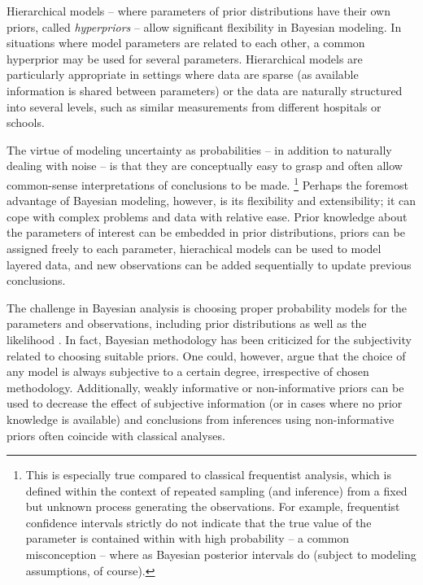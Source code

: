 Hierarchical models -- where parameters of prior distributions have their own
priors, called \emph{hyperpriors} -- allow significant flexibility in Bayesian
modeling. In situations where model parameters are related to each other, a
common hyperprior may be used for several parameters. Hierarchical models are
particularly appropriate in settings where data are sparse (as available
information is shared between parameters) or the data are naturally structured
into several levels, such as similar measurements from different hospitals or
schools.

The virtue of modeling uncertainty as probabilities -- in addition to
naturally dealing with noise -- is that they are conceptually easy to grasp
and often allow common-sense interpretations of conclusions to be made.
\footnote{This is especially true compared to classical frequentist analysis,
which is defined within the context of repeated sampling (and inference) from
a fixed but unknown process generating the observations. For example,
frequentist confidence intervals strictly do not indicate that the true value
of the parameter is contained within with high probability -- a common
misconception -- where as Bayesian posterior intervals do (subject to modeling
assumptions, of course).} Perhaps the foremost advantage of Bayesian modeling,
however, is its flexibility and extensibility; it can cope with complex
problems and data with relative ease. Prior knowledge about the parameters of
interest can be embedded in prior distributions, priors can be assigned freely
to each parameter, hierachical models can be used to model layered data, and
new observations can be added sequentially to update previous conclusions.

The challenge in Bayesian analysis is choosing proper probability models for
the parameters and observations, including prior distributions as well as the
likelihood \citep{Gelman2013}. In fact, Bayesian methodology has been
criticized for the subjectivity related to choosing suitable priors. One could, however,
argue that the choice of any model is always subjective to a certain degree,
irrespective of chosen methodology. Additionally, weakly informative or non-informative
priors can be used to decrease the effect of subjective information (or
in cases where no prior knowledge is available) and conclusions from
inferences using non-informative priors often coincide with classical
analyses.


